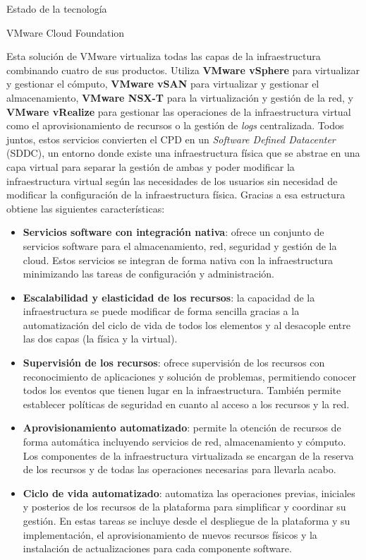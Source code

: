 \begin{section}{Estado de la tecnología}
\begin{subsection}{VMware Cloud Foundation}

    Esta solución de VMware virtualiza todas las capas de la infraestructura combinando cuatro de sus productos. Utiliza \textbf{VMware vSphere} para virtualizar y gestionar el cómputo, \textbf{VMware vSAN} para virtualizar y gestionar el almacenamiento, \textbf{VMware NSX-T} para la virtualización y gestión de la red, y \textbf{VMware vRealize} para gestionar las operaciones de la infraestructura virtual como el aprovisionamiento de recursos o la gestión de \textit{logs} centralizada. Todos juntos, estos servicios convierten el CPD en un \textit{Software Defined Datacenter} (SDDC), un entorno donde existe una infraestructura física que se abstrae en una capa virtual para separar la gestión de ambas y poder modificar la infraestructura virtual según las necesidades de los usuarios sin necesidad de modificar la configuración de la infraestructura física. Gracias a esa estructura obtiene las siguientes características:
\begin{itemize}
    \item \textbf{Servicios software con integración nativa}: ofrece un conjunto de servicios software para el almacenamiento, red, seguridad y gestión de la cloud. Estos servicios se integran de forma nativa con la infraestructura minimizando las tareas de configuración y administración.
    \item \textbf{Escalabilidad y elasticidad de los recursos}: la capacidad de la infraestructura se puede modificar de forma sencilla gracias a la automatización del ciclo de vida de todos los elementos y al desacople entre las dos capas (la física y la virtual).
    \item \textbf{Supervisión de los recursos}: ofrece supervisión de los recursos con reconocimiento de aplicaciones y solución de problemas, permitiendo conocer todos los eventos que tienen lugar en la infraestructura. También permite establecer políticas de seguridad en cuanto al acceso a los recursos y la red.
    \item \textbf{Aprovisionamiento automatizado}: permite la otención de recursos de forma automática incluyendo servicios de red, almacenamiento y cómputo. Los componentes de la infraestructura virtualizada se encargan de la reserva de los recursos y de todas las operaciones necesarias para llevarla acabo.
    \item \textbf{Ciclo de vida automatizado}: automatiza las operaciones previas, iniciales y posterios de los recursos de la plataforma para simplificar y coordinar su gestión. En estas tareas se incluye desde el despliegue de la plataforma y su implementación, el aprovisionamiento de nuevos recursos físicos y la instalación de actualizaciones para cada componente software.
   

\end{itemize}
\end{subsection}
\end{section}
